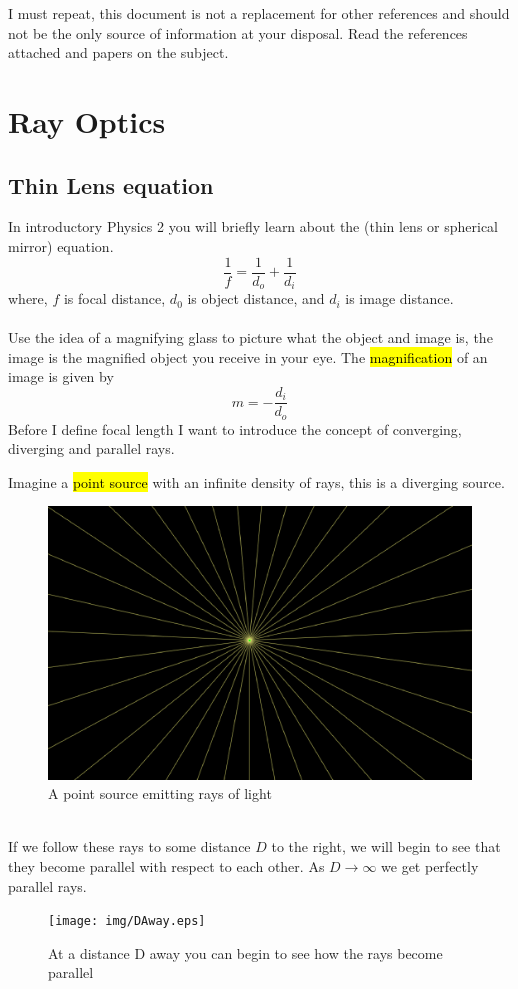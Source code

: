 \documentclass{article}
\begin{document}
I must repeat, this document is not a replacement for other references and should not be the only source of information at your disposal. Read the references attached and papers on the subject.
\newpage

\section{Ray Optics}
\subsection{Thin Lens equation}
In introductory Physics 2 you will briefly learn about the (thin lens or spherical mirror) equation.
\begin{equation}
    \frac{1}{f} = \frac{1}{d_o} + \frac{1}{d_i}
\end{equation}
where, $f$ is focal distance, $d_0$ is object distance, and $d_i$ is image distance.
\\
\
\\
Use the idea of a magnifying glass to picture what the object and image is, the image is the magnified object you receive in your eye.
The \hl{magnification} of an image is given by
\begin{equation}
    m = -\frac{d_i}{d_o}
\end{equation}
Before I define focal length I want to introduce the concept of converging, diverging and parallel rays.

Imagine a \hl{point source} with an infinite density of rays, this is a diverging source.
\begin{figure}[!phtb]
    \centering
    \includegraphics[width=0.6\linewidth]{img/PointSource.eps}
    \caption{A point source emitting rays of light}
    \label{fig:PointSource}
\end{figure}
\\
If we follow these rays to some distance $D$ to the right, we will begin to see that they become parallel with respect to each other.
As $D\rightarrow\infty$ we get perfectly parallel rays.
\\
\begin{figure}[!phtb]
    \centering
    \texttt{[image: img/DAway.eps]}
    \caption{At a distance D away you can begin to see how the rays become parallel}
    \label{fig:PointSource}
\end{figure}
\end{document}
